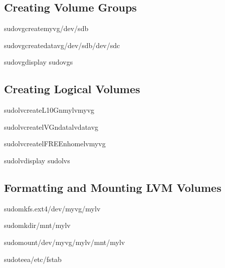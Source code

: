 \documentclass[letterpaper,10pt,english]{sphinxmanual}
\begin{document}
\subsection{Creating Volume Groups}
\label{\detokenize{volume-management:creating-volume-groups}}
\begin{sphinxVerbatim}[commandchars=\\\{\}]
sudovgcreatemyvg/dev/sdb

sudovgcreatedatavg/dev/sdb/dev/sdc

sudovgdisplay
sudovgs
\end{sphinxVerbatim}


\subsection{Creating Logical Volumes}
\label{\detokenize{volume-management:creating-logical-volumes}}
\begin{sphinxVerbatim}[commandchars=\\\{\}]
sudolvcreate\PYGZhy{}L10G\PYGZhy{}nmylvmyvg

sudolvcreate\PYGZhy{}l\PYGZpc{}VG\PYGZhy{}ndatalvdatavg

sudolvcreate\PYGZhy{}l\PYGZpc{}FREE\PYGZhy{}nhomelvmyvg

sudolvdisplay
sudolvs
\end{sphinxVerbatim}


\subsection{Formatting and Mounting LVM Volumes}
\label{\detokenize{volume-management:formatting-and-mounting-lvm-volumes}}
\begin{sphinxVerbatim}[commandchars=\\\{\}]
sudomkfs.ext4/dev/myvg/mylv

sudomkdir/mnt/mylv

sudomount/dev/myvg/mylv/mnt/mylv

sudotee\PYGZhy{}a/etc/fstab
\end{sphinxVerbatim}
\end{document}
